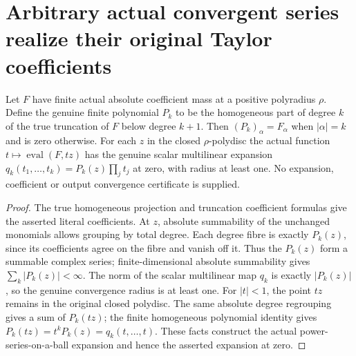 \section{Arbitrary actual convergent series realize their original Taylor coefficients}

\begin{theorem}
\label{hir:actual-convergent-scalar-line-expansion}
\leanok
Let $F$ have finite actual absolute coefficient mass at a positive polyradius
$\rho$. Define the genuine finite polynomial $P_k$ to be the homogeneous
part of degree $k$ of the true truncation of $F$ below degree $k+1$.
Then $(P_k)_\alpha=F_\alpha$ when $|\alpha|=k$ and is zero otherwise.
For each $z$ in the closed $\rho$-polydisc the actual function
$t\mapsto\operatorname{eval}(F,tz)$ has the genuine scalar multilinear
expansion $q_k(t_1,\ldots,t_k)=P_k(z)\prod_jt_j$ at zero, with radius at
least one. No expansion,
coefficient or output convergence certificate is supplied.
\end{theorem}
\begin{proof}
The true homogeneous projection and truncation coefficient formulas give
the asserted literal coefficients. At $z$, absolute summability of the
unchanged monomials allows grouping by total degree. Each degree fibre is
exactly $P_k(z)$, since its coefficients agree on the fibre and vanish
off it. Thus the $P_k(z)$ form a summable complex series; finite-dimensional
absolute summability gives $\sum_k|P_k(z)|<\infty$. The norm of the scalar
multilinear map $q_k$ is exactly $|P_k(z)|$, so the genuine convergence
radius is at least one. For $|t|<1$, the point $tz$ remains in the original
closed polydisc. The same absolute degree regrouping gives a sum of
$P_k(tz)$; the finite homogeneous polynomial identity gives
$P_k(tz)=t^kP_k(z)=q_k(t,\ldots,t)$. These facts construct the actual
power-series-on-a-ball expansion and hence the asserted expansion at zero.
\end{proof}


